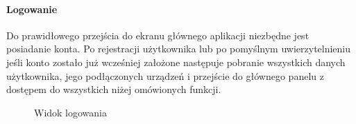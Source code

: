 \paragraph{Logowanie}
Do prawidłowego przejścia do ekranu głównego aplikacji niezbędne jest posiadanie konta. Po rejestracji użytkownika lub po pomyślnym uwierzytelnieniu jeśli konto zostało już wcześniej założone następuje pobranie wszystkich danych użytkownika, jego podłączonych urządzeń i przejście do głównego panelu z dostępem do wszystkich niżej omówionych funkcji.
\nopagebreak
\begin{figure}[H]
   \centering
   \hfill
   \hfill
   \caption{Widok logowania}
   \label{fig:logowanie}
\end{figure}

